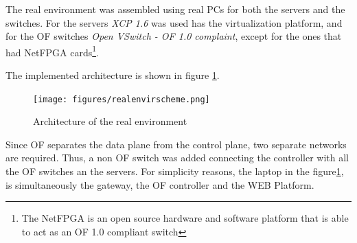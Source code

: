 \documentclass[12pt,english,oneside]{book}
\begin{document}
The real environment was assembled using real PCs for both the servers and the switches.
For the servers \textit{XCP 1.6} was used has the virtualization platform, and for the OF switches \textit{Open VSwitch - OF 1.0 complaint}, except for the ones that had NetFPGA cards\footnote{The NetFPGA is an open source hardware and software platform that is able to act as an OF 1.0 compliant switch}.

The implemented architecture is shown in figure \ref{fig:realenvarch}.

\begin{figure}[h!tbp]
        \centering
        \texttt{[image: figures/realenvirscheme.png]}
        \caption{Architecture of the real environment}
        \label{fig:realenvarch}
\end{figure}

Since OF separates the data plane from the control plane, two separate networks are required. Thus, a non OF switch was added connecting the controller with all the OF switches an the servers.
For simplicity reasons, the laptop in the figure\ref{fig:realenvarch}, is simultaneously the gateway, the OF controller and the WEB Platform.
\end{document}
